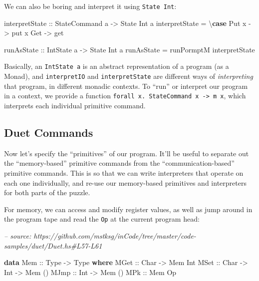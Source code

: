 \documentclass[]{article}
\newenvironment{Shaded}{}{}
\newcommand{\CommentTok}[1]{\textcolor[rgb]{0.38,0.63,0.69}{\textit{#1}}}
\newcommand{\DataTypeTok}[1]{\textcolor[rgb]{0.56,0.13,0.00}{#1}}
\newcommand{\FunctionTok}[1]{\textcolor[rgb]{0.02,0.16,0.49}{#1}}
\newcommand{\KeywordTok}[1]{\textcolor[rgb]{0.00,0.44,0.13}{\textbf{#1}}}
\newcommand{\NormalTok}[1]{#1}
\newcommand{\OtherTok}[1]{\textcolor[rgb]{0.00,0.44,0.13}{#1}}
\begin{document}
We can also be boring and interpret it using \texttt{State\ Int}:

\begin{Shaded}
\begin{Highlighting}[]
\OtherTok{interpretState ::} \DataTypeTok{StateCommand}\NormalTok{ a }\OtherTok{->} \DataTypeTok{State} \DataTypeTok{Int}\NormalTok{ a}
\NormalTok{interpretState }\FunctionTok{=}\NormalTok{ \textbackslash{}}\KeywordTok{case}
    \DataTypeTok{Put}\NormalTok{ x }\OtherTok{->}\NormalTok{ put x}
    \DataTypeTok{Get}   \OtherTok{->}\NormalTok{ get}

\OtherTok{runAsState ::} \DataTypeTok{IntState}\NormalTok{ a }\OtherTok{->} \DataTypeTok{State} \DataTypeTok{Int}\NormalTok{ a}
\NormalTok{runAsState }\FunctionTok{=}\NormalTok{ runPormptM interpretState}
\end{Highlighting}
\end{Shaded}

Basically, an \texttt{IntState\ a} is an abstract representation of a program
(as a Monad), and \texttt{interpretIO} and \texttt{interpretState} are different
ways of \emph{interpreting} that program, in different monadic contexts. To
``run'' or interpret our program in a context, we provide a function
\texttt{forall\ x.\ StateCommand\ x\ -\textgreater{}\ m\ x}, which interprets
each individual primitive command.

\hypertarget{duet-commands}{%
\subsection{Duet Commands}\label{duet-commands}}

Now let's specify the ``primitives'' of our program. It'll be useful to separate
out the ``memory-based'' primitive commands from the ``communication-based''
primitive commands. This is so that we can write interpreters that operate on
each one individually, and re-use our memory-based primitives and interpreters
for both parts of the puzzle.

For memory, we can access and modify register values, as well as jump around in
the program tape and read the \texttt{Op} at the current program head:

\begin{Shaded}
\begin{Highlighting}[]
\CommentTok{-- source: https://github.com/mstksg/inCode/tree/master/code-samples/duet/Duet.hs#L57-L61}

\KeywordTok{data} \DataTypeTok{Mem}\OtherTok{ ::} \DataTypeTok{Type} \OtherTok{->} \DataTypeTok{Type} \KeywordTok{where}
    \DataTypeTok{MGet}\OtherTok{ ::} \DataTypeTok{Char} \OtherTok{->} \DataTypeTok{Mem} \DataTypeTok{Int}
    \DataTypeTok{MSet}\OtherTok{ ::} \DataTypeTok{Char} \OtherTok{->} \DataTypeTok{Int} \OtherTok{->} \DataTypeTok{Mem}\NormalTok{ ()}
    \DataTypeTok{MJmp}\OtherTok{ ::} \DataTypeTok{Int}  \OtherTok{->} \DataTypeTok{Mem}\NormalTok{ ()}
    \DataTypeTok{MPk}\OtherTok{  ::} \DataTypeTok{Mem} \DataTypeTok{Op}
\end{Highlighting}
\end{Shaded}
\end{document}
